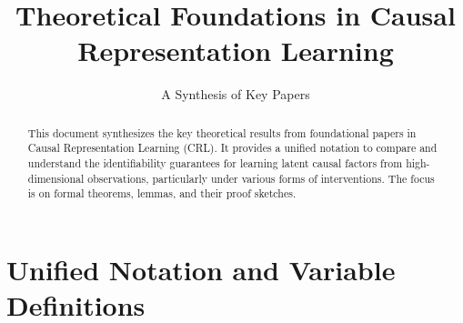 \documentclass{article}
\title{Theoretical Foundations in Causal Representation Learning}
\author{A Synthesis of Key Papers}
\date{}
\begin{document}
\maketitle

\begin{abstract}
This document synthesizes the key theoretical results from foundational papers in Causal Representation Learning (CRL). It provides a unified notation to compare and understand the identifiability guarantees for learning latent causal factors from high-dimensional observations, particularly under various forms of interventions. The focus is on formal theorems, lemmas, and their proof sketches.
\end{abstract}

\section{Unified Notation and Variable Definitions}
\end{document}
